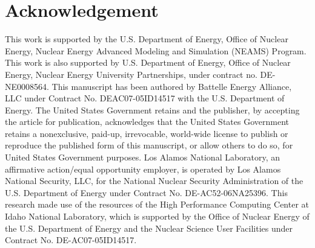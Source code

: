 \documentclass[review]{elsarticle}
\providecommand{\DIFaddbegin}{} %
\newcommand{\DIFaddincludegraphics}[2][]{{\color{blue}\fbox{\DIFOincludegraphics[#1]{#2}}}} %
\DeclareRobustCommand{\DIFaddbegin}{\DIFOaddbegin \let\includegraphics\DIFaddincludegraphics} %
\begin{document}
\section{Acknowledgement}
This work is supported by the U.S. Department of Energy, Office of Nuclear Energy, Nuclear Energy Advanced Modeling and Simulation (NEAMS) Program. This work is also supported by U.S. Department of Energy, Office of Nuclear Energy, Nuclear Energy University Partnerships, under contract no. DE-NE0008564. This manuscript has been authored by Battelle Energy Alliance, LLC under Contract No. DEAC07-05ID14517 with the U.S. Department of Energy. The United States Government retains and the publisher, by accepting the article for publication, acknowledges that the United States Government retains a nonexclusive, paid-up, irrevocable, world-wide license to publish or reproduce the published form of this manuscript, or allow others to do so, for United States Government purposes. Los Alamos National Laboratory, an affirmative action/equal opportunity employer, is operated by Los Alamos National Security, LLC, for the National Nuclear Security Administration of the U.S. Department of Energy under Contract No. DE-AC52-06NA25396. This research made use of the resources of the High Performance Computing Center at Idaho National Laboratory, which is supported by the Office of Nuclear Energy of the U.S. Department of Energy and the Nuclear Science User Facilities under Contract No. DE-AC07-05ID14517.
\DIFaddbegin 
\end{document}
